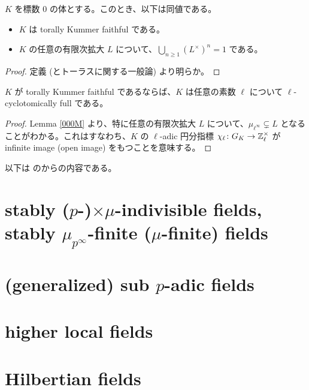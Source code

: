 \begin{lem}\label{000M}
  $K$ を標数 $0$ の体とする。このとき、以下は同値である。
  \begin{itemize}
    \item $K$ は torally Kummer faithful である。
    \item $K$ の任意の有限次拡大 $L$ について、$\bigcup_{n \geq 1} \left( L^\times \right)^n = 1$ である。
  \end{itemize}
\end{lem}
\begin{proof}
  定義 (とトーラスに関する一般論) より明らか。
\end{proof}

\begin{lem}\label{000N}
  $K$ が torally Kummer faithful であるならば、$K$ は任意の素数 $\ell$ について $\ell$-cyclotomically full である。
\end{lem}
\begin{proof}
  Lemma \ref{000M} より、特に任意の有限次拡大 $L$ について、$\mu_{\ell^\infty} \subsetneq L$ となることがわかる。これはすなわち、$K$ の $\ell$-adic 円分指標 $\chi_\ell \colon G_K \to \mathbb{Z}_\ell^\times$ が infinite image (open image) をもつことを意味する。
\end{proof}

以下は \cite[\S 1]{AbsTopIII} のからの内容である。


\section{stably ($p$-)$\times\mu$-indivisible fields, stably $\mu_{p^\infty}$-finite ($\mu$-finite) fields}

\section{(generalized) sub $p$-adic fields}

\section{higher local fields}

\section{Hilbertian fields}
